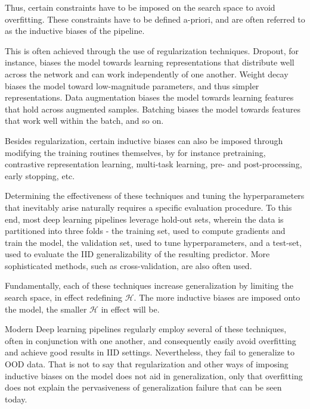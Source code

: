 	Thus, certain constraints have to be imposed on the search space to avoid overfitting. These constraints have to be defined a-priori, and are often referred to as the inductive biases of the pipeline. 

	This is often achieved through the use of regularization techniques. Dropout, for instance, biases the model towards learning representations that distribute well across the network and can work independently of one another. Weight decay biases the model toward low-magnitude parameters, and thus simpler representations. Data augmentation biases the model towards learning features that hold across augmented samples. Batching biases the model towards features that work well within the batch, and so on.

	Besides regularization, certain inductive biases can also be imposed through modifying the training routines themselves, by for instance pretraining, contrastive representation learning, multi-task learning, pre- and post-processing, early stopping, etc. 

	Determining the effectiveness of these techniques and tuning the hyperparameters that inevitably arise naturally requires a specific evaluation procedure. To this end, most deep learning pipelines leverage hold-out sets, wherein the data is partitioned into three folds - the training set, used to compute gradients and train the model, the validation set, used to tune hyperparameters, and a test-set, used to evaluate the IID generalizability of the resulting predictor. More sophisticated methods, such as cross-validation, are also often used. 

	Fundamentally, each of these techniques increase generalization by limiting the search space, in effect redefining \(\mathcal{H}\). The more inductive biases are imposed onto the model, the smaller \(\mathcal{H}\) in effect will be. 

	Modern Deep learning pipelines regularly employ several of these techniques, often in conjunction with one another, and consequently easily avoid overfitting and achieve good results in IID settings. Nevertheless, they fail to generalize to OOD data. That is not to say that regularization and other ways of imposing inductive biases on the model does not aid in generalization, only that overfitting does not explain the pervasiveness of generalization failure that can be seen today. 

